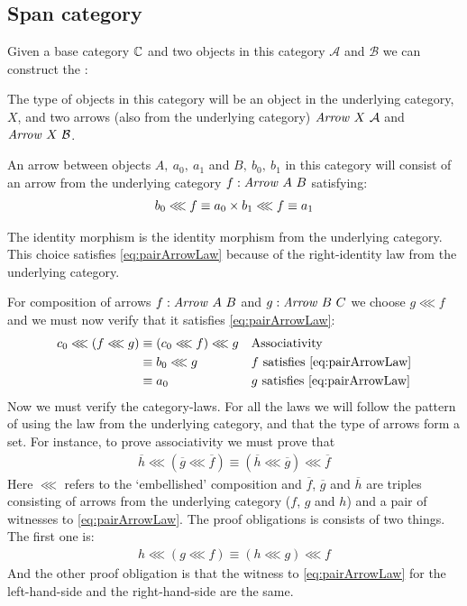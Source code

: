 \subsection{Span category}

\newcommand\pairA{\mathcal{A}}
\newcommand\pairB{\mathcal{B}}
Given a base category $\mathbb{C}$ and two objects in this category $\pairA$ and
$\pairB$ we can construct the :

The type of objects in this category will be an object in the underlying
category, $X$, and two arrows (also from the underlying category)
$\Arrow\ X\ \pairA$ and $\Arrow\ X\ \pairB$.

\newcommand\pairf{\ensuremath{f}}
\newcommand\pairFst{\mathcal{\pi_1}}
\newcommand\pairSnd{\mathcal{\pi_2}}

An arrow between objects $A ,\ a_0 ,\ a_1$ and $B ,\ b_0 ,\ b_1$ in this
category will consist of an arrow from the underlying category $\pairf \tp
\Arrow\ A\ B$ satisfying:
%
\begin{align}
\label{eq:pairArrowLaw}
b_0 \lll f \equiv a_0 \times
b_1 \lll f \equiv a_1
\end{align}

The identity morphism is the identity morphism from the underlying category.
This choice satisfies \ref{eq:pairArrowLaw} because of the right-identity law
from the underlying category.

For composition of arrows $f \tp \Arrow\ A\ B$ and $g \tp \Arrow\ B\ C$ we
choose $g \lll f$ and we must now verify that it satisfies
\ref{eq:pairArrowLaw}:
%
\begin{align*}
  c_0 \lll (f \lll g)
  & \equiv
  (c_0 \lll f) \lll g
  && \text{Associativity} \\
  & \equiv
  b_0 \lll g
  && \text{$f$ satisfies \ref{eq:pairArrowLaw}} \\
  & \equiv
  a_0
  && \text{$g$ satisfies \ref{eq:pairArrowLaw}} \\
\end{align*}
%
Now we must verify the category-laws. For all the laws we will follow the
pattern of using the law from the underlying category, and that the type of
arrows form a set. For instance, to prove associativity we must prove that
%
\begin{align}
\label{eq:productAssoc}
\overline{h} \lll (\overline{g} \lll \overline{f})
\equiv
(\overline{h} \lll \overline{g}) \lll \overline{f}
\end{align}
%
Here $\lll$ refers to the `embellished' composition and $\overline{f}$,
$\overline{g}$ and $\overline{h}$ are triples consisting of arrows from the
underlying category ($f$, $g$ and $h$) and a pair of witnesses to
\ref{eq:pairArrowLaw}.
The proof obligations is consists of two things. The first one is:
%
\begin{align}
\label{eq:productAssocUnderlying}
h \lll (g \lll f)
\equiv
(h \lll g) \lll f
\end{align}
%
And the other proof obligation is that the witness to \ref{eq:pairArrowLaw} for
the left-hand-side and the right-hand-side are the same.

